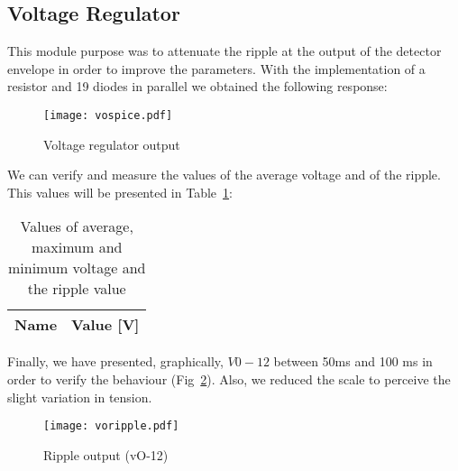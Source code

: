 \subsection{Voltage Regulator}

 
This module purpose was to attenuate the ripple at the output of the detector envelope in order to improve the parameters. With the implementation of a resistor and 19 diodes in parallel we obtained the following response: 

\vspace{-0.9in}
\begin{figure}[H] \centering
\texttt{[image: vospice.pdf]}
\caption{Voltage regulator output}
\label{fig:vo}
\end{figure}

\newpage
We can verify and measure the values of the average voltage and of the ripple. This values will be presented in Table~\ref{tab:r}:


\vspace{0.1in}
\begin{table}[ht]
  \centering
  \begin{tabular}{|l|r|}
    \hline    
    {\bf Name} & {\bf Value [V]} \\ \hline
    
  \end{tabular}
  \caption{Values of average, maximum and minimum voltage and the ripple value}
  \label{tab:r}
\end{table}
\vspace{0.3in}

Finally, we have presented, graphically, $V0-12$ between 50ms and 100 ms in order to verify the behaviour (Fig~\ref{fig:vori}). Also, we reduced the scale to perceive the slight variation in tension.

\vspace{-0.9in}
\begin{figure}[H] \centering
\texttt{[image: voripple.pdf]}
\caption{Ripple output (vO-12)}
\label{fig:vori}
\end{figure}


\newpage


